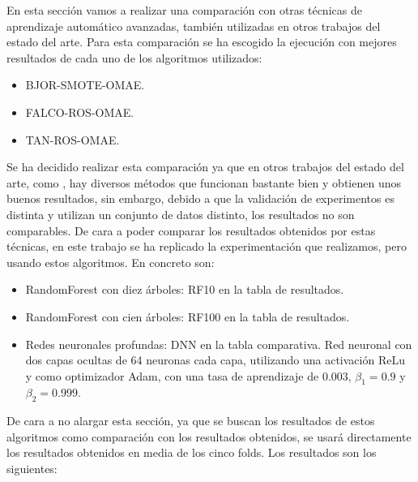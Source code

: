 En esta sección vamos a realizar una comparación con otras técnicas de aprendizaje automático avanzadas, también utilizadas en otros trabajos del estado del arte. Para esta comparación se ha escogido la ejecución con mejores resultados de cada uno de los algoritmos utilizados:

\begin{itemize}
	\item BJOR-SMOTE-OMAE.
	\item FALCO-ROS-OMAE.
	\item TAN-ROS-OMAE.
\end{itemize}

Se ha decidido realizar esta comparación ya que en otros trabajos del estado del arte, como \cite{NSLVOrdAge}, hay diversos métodos que funcionan bastante bien y obtienen unos buenos resultados, sin embargo, debido a que la validación de experimentos es distinta y utilizan un conjunto de datos distinto, los resultados no son comparables. De cara a poder comparar los resultados obtenidos por estas técnicas, en este trabajo se ha replicado la experimentación que realizamos, pero usando estos algoritmos. En concreto son:

\begin{itemize}
	\item RandomForest con diez árboles: RF10 en la tabla de resultados.
	\item RandomForest con cien árboles: RF100 en la tabla de resultados.
	\item Redes neuronales profundas: DNN en la tabla comparativa. Red neuronal con dos capas ocultas de 64 neuronas cada capa, utilizando una activación ReLu y como optimizador Adam, con una tasa de aprendizaje de $0.003$, $\beta_1 = 0.9$ y $\beta_2 = 0.999$.
\end{itemize}

De cara a no alargar esta sección, ya que se buscan los resultados de estos algoritmos como comparación con los resultados obtenidos, se usará directamente los resultados obtenidos en media de los cinco folds. Los resultados son los siguientes:

